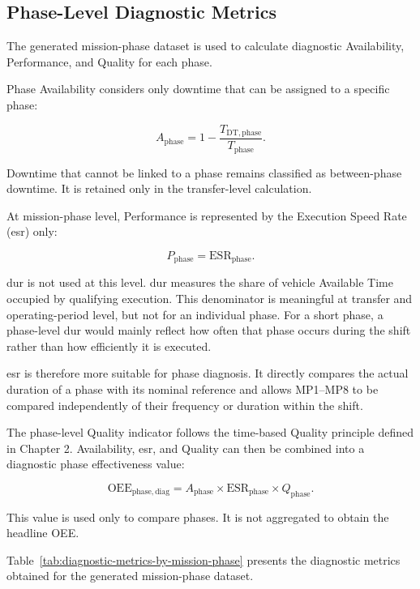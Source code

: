 \subsection{Phase-Level Diagnostic Metrics}
\label{subsec:phase-level-diagnostic-metrics}
The generated mission-phase dataset is used to calculate diagnostic Availability, Performance, and Quality for each phase.

Phase Availability considers only downtime that can be assigned to a specific phase:

$$
A_{\mathrm{phase}} = 1 - \frac{T_{\mathrm{DT},\mathrm{phase}}}{T_{\mathrm{phase}}}.
$$

Downtime that cannot be linked to a phase remains classified as between-phase downtime. It is retained only in the transfer-level calculation.

At mission-phase level, Performance is represented by the Execution Speed Rate (\acrshort{esr}) only:

$$
P_{\mathrm{phase}} = \mathrm{ESR}_{\mathrm{phase}}.
$$

\acrshort{dur} is not used at this level. \acrshort{dur} measures the share of vehicle Available Time occupied by qualifying execution. This denominator is meaningful at transfer and operating-period level, but not for an individual phase. For a short phase, a phase-level \acrshort{dur} would mainly reflect how often that phase occurs during the shift rather than how efficiently it is executed.

\acrshort{esr} is therefore more suitable for phase diagnosis. It directly compares the actual duration of a phase with its nominal reference and allows MP1--MP8 to be compared independently of their frequency or duration within the shift.

The phase-level Quality indicator follows the time-based Quality principle defined in Chapter 2. Availability, \acrshort{esr}, and Quality can then be combined into a diagnostic phase effectiveness value:

$$
\mathrm{OEE}_{\mathrm{phase},\mathrm{diag}} = A_{\mathrm{phase}} \times \mathrm{ESR}_{\mathrm{phase}} \times Q_{\mathrm{phase}}.
$$

This value is used only to compare phases. It is not aggregated to obtain the headline OEE.

Table~\ref{tab:diagnostic-metrics-by-mission-phase} presents the diagnostic metrics obtained for the generated mission-phase dataset.

